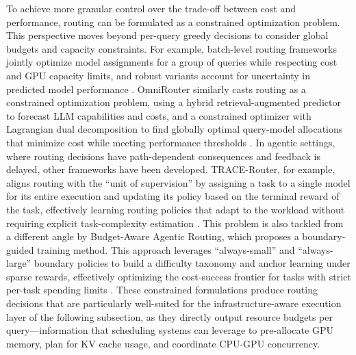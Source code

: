 \documentclass[11pt]{article}
\begin{document}
To achieve more granular control over the trade-off between cost and performance, routing can be formulated as a constrained optimization problem. This perspective moves beyond per-query greedy decisions to consider global budgets and capacity constraints. For example, batch-level routing frameworks jointly optimize model assignments for a group of queries while respecting cost and GPU capacity limits, and robust variants account for uncertainty in predicted model performance \cite{ref285}. OmniRouter similarly casts routing as a constrained optimization problem, using a hybrid retrieval-augmented predictor to forecast LLM capabilities and costs, and a constrained optimizer with Lagrangian dual decomposition to find globally optimal query-model allocations that minimize cost while meeting performance thresholds \cite{ref286}. In agentic settings, where routing decisions have path-dependent consequences and feedback is delayed, other frameworks have been developed. TRACE-Router, for example, aligns routing with the ``unit of supervision'' by assigning a task to a single model for its entire execution and updating its policy based on the terminal reward of the task, effectively learning routing policies that adapt to the workload without requiring explicit task-complexity estimation \cite{ref287}. This problem is also tackled from a different angle by Budget-Aware Agentic Routing, which proposes a boundary-guided training method. This approach leverages ``always-small'' and ``always-large'' boundary policies to build a difficulty taxonomy and anchor learning under sparse rewards, effectively optimizing the cost-success frontier for tasks with strict per-task spending limits \cite{ref288}. These constrained formulations produce routing decisions that are particularly well-suited for the infrastructure-aware execution layer of the following subsection, as they directly output resource budgets per query---information that scheduling systems can leverage to pre-allocate GPU memory, plan for KV cache usage, and coordinate CPU-GPU concurrency.
\end{document}
